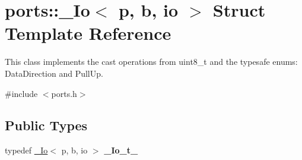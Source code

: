 \hypertarget{structports_1_1__Io}{}\section{ports\+:\+:\+\_\+\+Io$<$ p, b, io $>$ Struct Template Reference}
\label{structports_1_1__Io}


This class implements the cast operations from uint8\+\_\+t and the typesafe enums\+: Data\+Direction and Pull\+Up.  




{\ttfamily \#include $<$ports.\+h$>$}

\subsection*{Public Types}
\begin{DoxyCompactItemize}
\item 
typedef \hyperlink{structports_1_1__Io}{\+\_\+\+Io}$<$ p, b, io $>$ {\bfseries \+\_\+\+Io\+\_\+t\+\_\+}\hypertarget{structports_1_1__Io_aa0e505ef1e6b227c9217b6e09bbc29dd}{}\label{structports_1_1__Io_aa0e505ef1e6b227c9217b6e09bbc29dd}

\end{DoxyCompactItemize}
